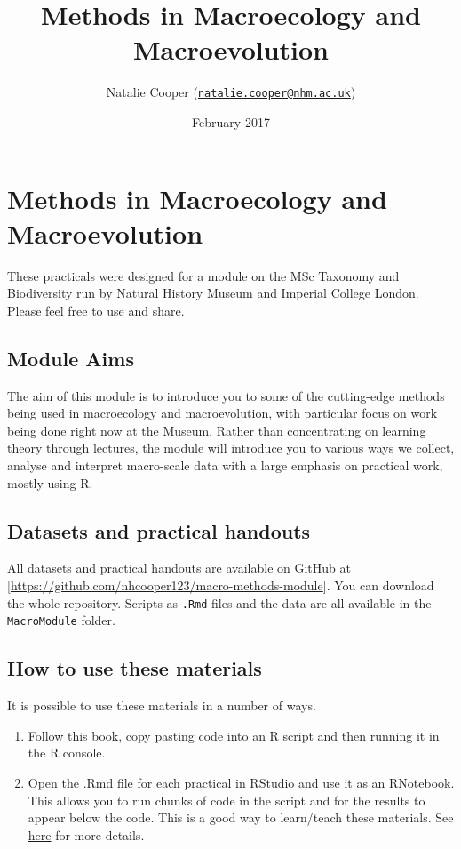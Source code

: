 \documentclass[]{book}
\title{Methods in Macroecology and Macroevolution}
\author{Natalie Cooper
(\href{mailto:natalie.cooper@nhm.ac.uk}{\nolinkurl{natalie.cooper@nhm.ac.uk}})}
\date{February 2017}
\providecommand{\tightlist}{%
  \setlength{\itemsep}{0pt}\setlength{\parskip}{0pt}}
\theoremstyle{definition}
\theoremstyle{definition}
\theoremstyle{definition}
\theoremstyle{remark}
\begin{document}
\maketitle

{
\setcounter{tocdepth}{1}
\tableofcontents
}
\chapter{Methods in Macroecology and
Macroevolution}\label{methods-in-macroecology-and-macroevolution}

These practicals were designed for a module on the MSc Taxonomy and
Biodiversity run by Natural History Museum and Imperial College London.
Please feel free to use and share.

\section{Module Aims}\label{module-aims}

The aim of this module is to introduce you to some of the cutting-edge
methods being used in macroecology and macroevolution, with particular
focus on work being done right now at the Museum. Rather than
concentrating on learning theory through lectures, the module will
introduce you to various ways we collect, analyse and interpret
macro-scale data with a large emphasis on practical work, mostly using
R.

\section{Datasets and practical
handouts}\label{datasets-and-practical-handouts}

All datasets and practical handouts are available on GitHub at
{[}\url{https://github.com/nhcooper123/macro-methods-module}{]}. You can
download the whole repository. Scripts as \texttt{.Rmd} files and the
data are all available in the \texttt{MacroModule} folder.

\section{How to use these materials}\label{how-to-use-these-materials}

It is possible to use these materials in a number of ways.

\begin{enumerate}
\def\labelenumi{\arabic{enumi}.}
\tightlist
\item
  Follow this book, copy pasting code into an R script and then running
  it in the R console.
\item
  Open the .Rmd file for each practical in RStudio and use it as an
  RNotebook. This allows you to run chunks of code in the script and for
  the results to appear below the code. This is a good way to
  learn/teach these materials. See
  \href{http://rmarkdown.rstudio.com/r_notebooks.html}{here} for more
  details.
\end{enumerate}
\end{document}
